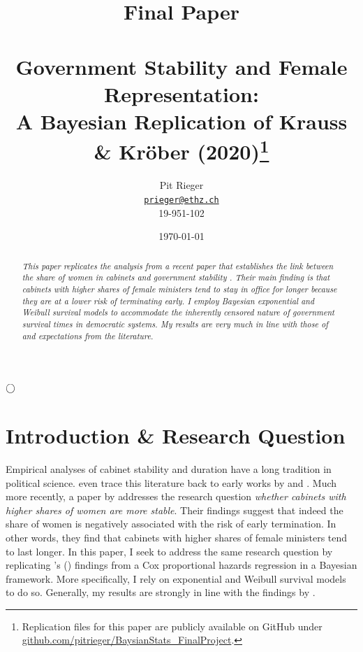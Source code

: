 \documentclass[11pt]{article}
\title{\large Final Paper \\ ~ \\
\LARGE  Government Stability and Female Representation:\\
A Bayesian Replication of Krauss \& Kröber (2020)\footnote[1]{Replication files for this paper are publicly available on GitHub under \url{github.com/pitrieger/BaysianStats_FinalProject}.}}
\author{Pit Rieger\\
    \href{mailto:prieger@ethz.ch}{\texttt{prieger@ethz.ch}}\\
    19-951-102}
\date{\today}
\newcommand\possecite[1]{\citeauthor{#1}'s (\citeyear{#1})}
\begin{document}
\maketitle

\bigskip
\bigskip
\bigskip
\bigskip
\begin{center}
    $\Huge \bigcirc$
\end{center}
\bigskip
\bigskip
\bigskip
\bigskip

\begin{abstract}
{\noindent\itshape
This paper replicates the analysis from a recent paper that establishes the link between the share of women in cabinets and government stability \parencite{KK20}. Their main finding is that cabinets with higher shares of female ministers tend to stay in office for longer because they are at a lower risk of terminating early. I employ Bayesian exponential and Weibull survival models to accommodate the inherently censored nature of government survival times in democratic systems. My results are very much in line with those of \textcite{KK20} and expectations from the literature.
}
\end{abstract}

\bigskip
\bigskip
\bigskip
\bigskip

\newpage


\section{Introduction \& Research Question}
Empirical analyses of cabinet stability and duration have a long tradition in political science. \textcite{LupiaStrøm1995} even trace this literature back to early works by \textcite{Bryce1921} and \textcite{Lowell1896}. Much more recently, a paper by \textcite{KK20} addresses the research question \textit{whether cabinets with higher shares of women are more stable}. Their findings suggest that indeed the share of women is negatively associated with the risk of early termination. In other words, they find that cabinets with higher shares of female ministers tend to last longer. In this paper, I seek to address the same research question by replicating \possecite{KK20} findings from a Cox proportional hazards regression in a Bayesian framework. More specifically, I rely on exponential and Weibull survival models to do so. Generally, my results are strongly in line with the findings by \textcite{KK20}.
\end{document}
